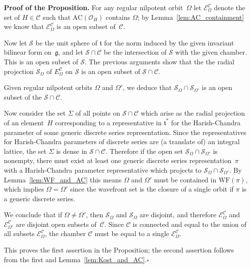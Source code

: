 \documentclass[10pt,leqno]{article}
\numberwithin{equation}{section}
\newcommand{\qed}{\hfill $\square$ \medskip}
\newenvironment{proof}[1][Proof]{\noindent\textbf{#1.} }{\qed}
\renewcommand{\t}{\mathfrak t}
\newcommand{\g}{\mathfrak g}
\newcommand{\WF}{\mathrm{WF}}
\newcommand{\AC}{\mathrm{AC}}
\newcommand{\ECom}{\mathcal{E}^{\mathcal{C}}_\Omega}
\begin{document}
\begin{proof}[Proof of the  Proposition]
For any regular nilpotent orbit~$\Omega$ let $\ECom$  denote the set of $H \in \mathcal{C}$ such that $\AC(\mathcal{O}_H)$ contains $\Omega$; by Lemma~\ref{lem:AC_containment}  we know that   $\ECom$ is an open subset of~$\mathcal{C}$. 

Now let $\mathcal{S}$ be the unit sphere of $\t$ for the norm induced by the given invariant bilinear form on~$\g$, and let $\mathcal{S} \cap \mathcal{C}$ be the intersection of $\mathcal{S}$ with the given chamber. This is an open subset of $\mathcal{S}$. The previous arguments show that the the radial projection $\mathcal{S}_{\Omega}$ of  $E^{\mathcal{C}}_\Omega$ on $\mathcal{S}$ is an open subset of $\mathcal{S} \cap \mathcal{C}$. 

Given regular nilpotent orbits $\Omega$ and $\Omega'$, we deduce that $\mathcal{S}_\Omega \cap \mathcal{S}_{\Omega'}$ is an open subset of the $\mathcal{S} \cap \mathcal{C}$.

Now consider the set $\Sigma$ of all points on $\mathcal{S} \cap \mathcal{C}$ which arise as the radial projection of an element~$H$ corresponding to a representative in $\t^\ast$ for the Harish-Chandra parameter of some generic discrete series representation. Since the representatives for Harish-Chandra parameters of discrete series are (a translate of) an integral lattice, the set $\Sigma$ is dense in $\mathcal{S} \cap \mathcal{C}$. Therefore if the open set $\mathcal{S}_\Omega \cap \mathcal{S}_{\Omega'}$ is nonempty, there must exist at least one generic discrete series representation~$\pi$ with a Harish-Chandra parameter representative which projects to $\mathcal{S}_\Omega \cap \mathcal{S}_{\Omega'}$. By Lemma~\ref{lem:WF_and_AC} this means $\Omega$ and $\Omega'$ must be contained in $\WF(\pi)$, which implies $\Omega = \Omega'$ since the wavefront set is the closure of a single orbit if $\pi$ is a generic discrete series. 

We conclude that if $\Omega \neq \Omega'$, then $\mathcal{S}_\Omega$ and $\mathcal{S}_\Omega$ are disjoint, and therefore $\ECom$ and $\mathcal{E}^{\mathcal{C}}_{\Omega'}$ are disjoint open subsets of~$\mathcal{C}$. Since $\mathcal{C}$ is connected and equal to the union of all subsets $\mathcal{E}^{\mathcal{C}}_{\Omega}$, the chamber $\mathcal{C}$ must be equal to a single $\ECom$.

This proves the first assertion in the Proposition; the second assertion follows from the first and Lemma~\ref{lem:Kost_and_AC}.\end{proof}
\end{document}
